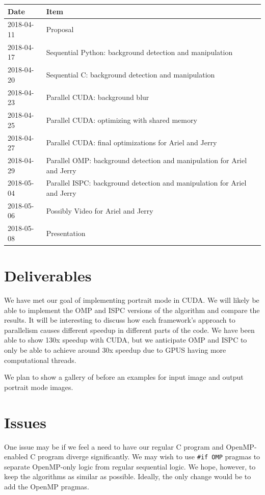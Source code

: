 \documentclass[12pt]{article}
\begin{document}
\begin{tabular}{l|l}
    Date & Item \\
    \hline
    2018-04-11 & Proposal \\
    2018-04-17 & Sequential Python: background detection and manipulation \\
    2018-04-20 & Sequential C: background detection and manipulation \\
    2018-04-23 & Parallel CUDA: background blur\\
    2018-04-25 & Parallel CUDA: optimizing with shared memory\\
    2018-04-27 & Parallel CUDA: final optimizations for Ariel and Jerry\\
    2018-04-29 & Parallel OMP: background detection and manipulation
                 for Ariel and Jerry\\
    2018-05-04 & Parallel ISPC: background detection and manipulation
                 for Ariel and Jerry\\
    2018-05-06 & Possibly Video for Ariel and Jerry\\
    2018-05-08 & Presentation
\end{tabular}

\section{Deliverables}

We have met our goal of implementing portrait mode in CUDA. We will likely be
able to implement the OMP and ISPC versions of the algorithm and compare the
results. It will be interesting to discuss how each framework's approach to
parallelism causes different speedup in different parts of the code. We have
been able to show 130x speedup with CUDA, but we anticipate OMP and ISPC to
only be able to achieve around 30x speedup due to GPUS having more
computational threads.

We plan to show a gallery of before an examples for input image and output
portrait mode images.

\section{Issues}

One issue may be if we feel a need to have our regular C program and OpenMP-
enabled C program diverge significantly. We may wish to use \texttt{\#if OMP}
pragmas to separate OpenMP-only logic from regular sequential logic. We hope,
however, to keep the algorithms as similar as possible. Ideally, the only
change would be to add the OpenMP pragmas.
\end{document}
